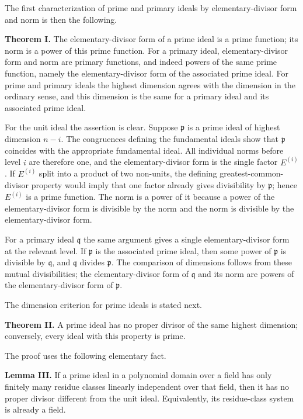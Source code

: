 \documentclass[11pt]{article}
\begin{document}
The first characterization of prime and primary ideals by elementary-divisor form and norm is then the following.

\textbf{Theorem I.} The elementary-divisor form of a prime ideal is a prime function; its norm is a power of this prime function. For a primary ideal, elementary-divisor form and norm are primary functions, and indeed powers of the same prime function, namely the elementary-divisor form of the associated prime ideal. For prime and primary ideals the highest dimension agrees with the dimension in the ordinary sense, and this dimension is the same for a primary ideal and its associated prime ideal.

For the unit ideal the assertion is clear. Suppose $\mathfrak p$ is a prime ideal of highest dimension $n-i$. The congruences defining the fundamental ideals show that $\mathfrak p$ coincides with the appropriate fundamental ideal. All individual norms before level $i$ are therefore one, and the elementary-divisor form is the single factor $E^{(i)}$. If $E^{(i)}$ split into a product of two non-units, the defining greatest-common-divisor property would imply that one factor already gives divisibility by $\mathfrak p$; hence $E^{(i)}$ is a prime function. The norm is a power of it because a power of the elementary-divisor form is divisible by the norm and the norm is divisible by the elementary-divisor form.

For a primary ideal $\mathfrak q$ the same argument gives a single elementary-divisor form at the relevant level. If $\mathfrak p$ is the associated prime ideal, then some power of $\mathfrak p$ is divisible by $\mathfrak q$, and $\mathfrak q$ divides $\mathfrak p$. The comparison of dimensions follows from these mutual divisibilities; the elementary-divisor form of $\mathfrak q$ and its norm are powers of the elementary-divisor form of $\mathfrak p$.

The dimension criterion for prime ideals is stated next.

\textbf{Theorem II.} A prime ideal has no proper divisor of the same highest dimension; conversely, every ideal with this property is prime.

The proof uses the following elementary fact.

\textbf{Lemma III.} If a prime ideal in a polynomial domain over a field has only finitely many residue classes linearly independent over that field, then it has no proper divisor different from the unit ideal. Equivalently, its residue-class system is already a field.
\end{document}
